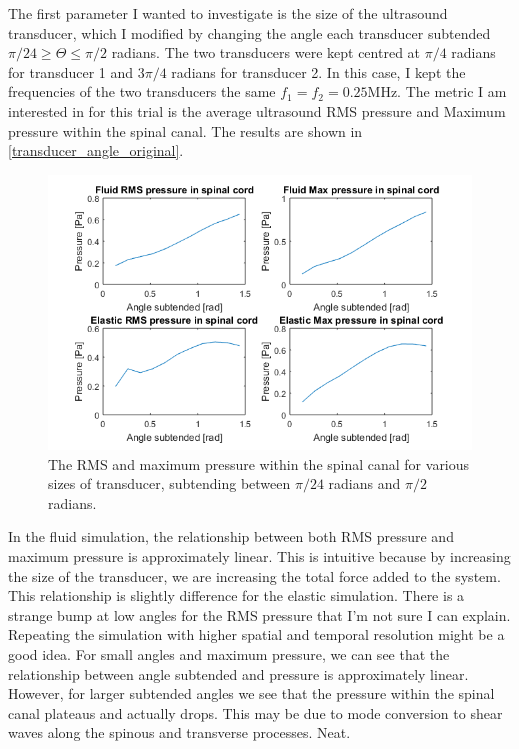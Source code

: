 \documentclass[10pt,a4paper]{article}
\begin{document}
The first parameter I wanted to investigate is the size of the ultrasound transducer, which I modified by changing the angle each transducer subtended  $\pi/24 \geq \Theta \leq \pi/2$ radians. The two transducers were kept centred at $\pi/4$ radians for transducer 1 and $3\pi/4$ radians for transducer 2. In this case, I kept the frequencies of the two transducers the same $f_1 = f_2 = 0.25$MHz. The metric I am interested in for this trial is the average ultrasound RMS pressure and Maximum pressure within the spinal canal. The results are shown in \autoref{transducer_angle_original}.

\begin{figure}[H]
\includegraphics[scale=0.8]{transducer_angle_original}
\caption{The RMS and maximum pressure within the spinal canal for various sizes of transducer, subtending between $\pi/24$ radians and $\pi/2$ radians.}
\end{figure}

In the fluid simulation, the relationship between both RMS pressure and maximum pressure is approximately linear. This is intuitive because by increasing the size of the transducer, we are increasing the total force added to the system. This relationship is slightly difference for the elastic simulation. There is a strange bump at low angles for the RMS pressure that I'm not sure I can explain. Repeating the simulation with higher spatial and temporal resolution might be a good idea. For small angles and maximum pressure, we can see that the relationship between angle subtended and pressure is approximately linear. However, for larger subtended angles we see that the pressure within the spinal canal plateaus and actually drops. This may be due to mode conversion to shear waves along the spinous and transverse processes. Neat. 
\end{document}
